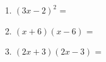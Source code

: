 \begin{enumerate}[label=\arabic*.,resume]
\begin{enumerate}[label=\alph*)]
        \item $(3x - 2)^2$ = \underline{\hspace{6cm}}

        \vspace{0.8cm}

        \item $(x + 6)(x - 6)$ = \underline{\hspace{6cm}}

        \vspace{0.8cm}

        \item $(2x + 3)(2x - 3)$ = \underline{\hspace{6cm}}

    \end{enumerate}

\end{enumerate}